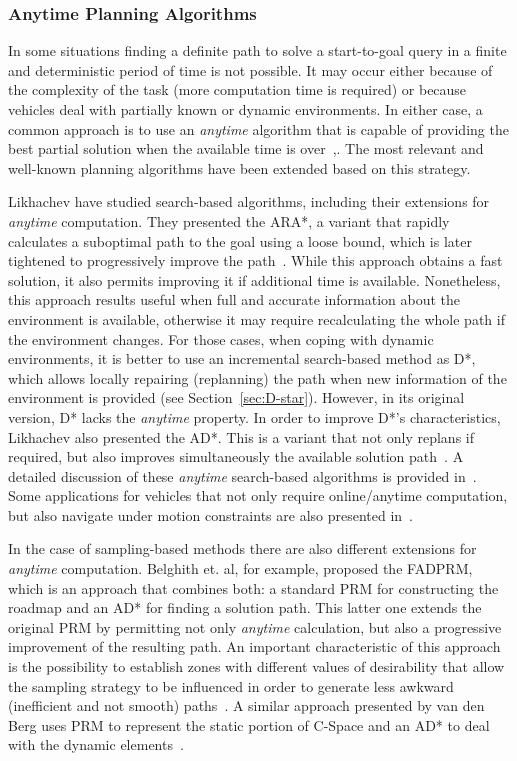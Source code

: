 \subsubsection{Anytime Planning Algorithms}

In some situations finding a definite path to solve a start-to-goal query in a
finite and deterministic period of time is not possible. It may occur either
because of the complexity of the task (\ie more computation time is required) or
because vehicles deal with partially known or dynamic environments. In either
case, a common approach is to use an \textit{anytime} algorithm that is capable
of providing the best partial solution when the available time is
over~\cite{Zilberstein1995},\cite{Dean1988}. The most relevant and well-known
planning algorithms have been extended based on this strategy.

Likhachev \etal have studied search-based algorithms, including their extensions
for \textit{anytime} computation. They presented the \ac{ARA*}, a variant that
rapidly calculates a suboptimal path to the goal using a loose bound, which is
later tightened to progressively improve the path~\cite{Likhachev2003}. While
this approach obtains a fast solution, it also permits improving it if
additional time is available. Nonetheless, this approach results useful when
full and accurate information about the environment is available, otherwise it
may require recalculating the whole path if the environment changes. For those
cases, \ie when coping with dynamic environments, it is better to use an
incremental search-based method as \ac{D*}, which allows locally repairing
(replanning) the path when new information of the environment is provided (see
Section~\ref{sec:D-star}). However, in its original version, \ac{D*} lacks the
\textit{anytime} property. In order to improve \ac{D*}'s characteristics,
Likhachev \etal also presented the \ac{AD*}. This is a variant that not only
replans if required, but also improves simultaneously the available solution
path~\cite{Likhachev2005}. A detailed discussion of these \textit{anytime}
search-based algorithms is provided in~\cite{Likhachev2008}.
Some applications for vehicles that not only require online/anytime computation,
but also navigate under motion constraints are also presented
in~\cite{Likhachev2009}.

In the case of sampling-based methods there are also different extensions for
\textit{anytime} computation. Belghith et. al, for example, proposed the
\ac{FADPRM}, which is an approach that combines both: a standard \ac{PRM} for
constructing the roadmap and an \ac{AD*} for finding a solution path. This
latter one extends the original \ac{PRM} by permitting not only \textit{anytime}
calculation, but also a progressive improvement of the resulting path. An
important characteristic of this approach is the possibility to establish zones
with different values of desirability that allow the sampling strategy to be
influenced in order to generate less awkward (inefficient and not smooth)
paths~\cite{Belghith2006}. A similar approach presented by van den Berg
\etal uses \ac{PRM} to represent the static portion of \ac{C-Space} and an
\ac{AD*} to deal with the dynamic elements~\cite{VandenBerg2006}.

